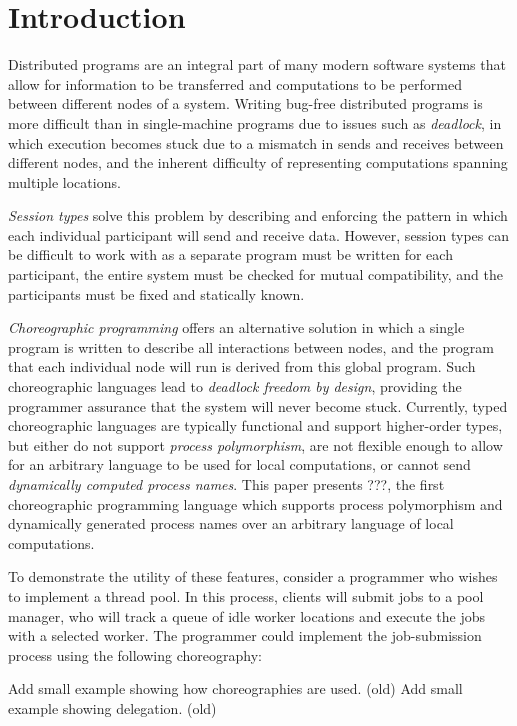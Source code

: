 \section{Introduction}
\label{sec:introduction}

Distributed programs are an integral part of many modern software systems that allow for information to be transferred and computations to be performed between different nodes of a system.
Writing bug-free distributed programs is more difficult than in single-machine programs due to issues such as \emph{deadlock}, in which execution becomes stuck due to a mismatch in sends and receives between different nodes, and the inherent difficulty of representing computations spanning multiple locations.

\emph{Session types} solve this problem by describing and enforcing the pattern in which each individual participant will send and receive data.
However, session types can be difficult to work with as a separate program must be written for each participant, the entire system must be checked for mutual compatibility, and the participants must be fixed and statically known.

\emph{Choreographic programming} offers an alternative solution in which a single program is written to describe all interactions between nodes, and the program that each individual node will run is derived from this global program.
Such choreographic languages lead to \emph{deadlock freedom by design}, providing the programmer assurance that the system will never become stuck.
Currently, typed choreographic languages are typically functional and support higher-order types, but either do not support \emph{process polymorphism}, are not flexible enough to allow for an arbitrary language to be used for local computations, or cannot send \emph{dynamically computed process names}.
This paper presents ???, the first choreographic programming language which supports process polymorphism and dynamically generated process names over an arbitrary language of local computations.

To demonstrate the utility of these features, consider a programmer who wishes to implement a thread pool.
In this process, clients will submit jobs to a pool manager, who will track a queue of idle worker locations and execute the jobs with a selected worker.
The programmer could implement the job-submission process using the following choreography:

Add small example showing how choreographies are used. (old)
Add small example showing delegation. (old)

